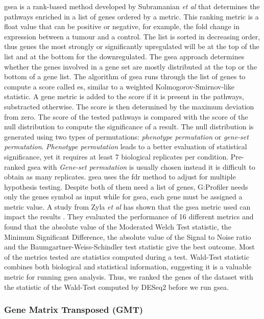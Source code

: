 \acrshort{gsea} is a rank-based method developed by Subramanian \textit{et al} \cite*{Subramanian2005} that determines the pathways enriched in a list of genes ordered by a metric.
This ranking metric is a float value that can be positive or negative, for example, the fold change in expression between a tumour and a control.
The list is sorted in decreasing order, thus genes the most strongly or significantly upregulated will be at the top of the list and at the bottom for the downregulated.
The \acrshort{gsea} approach determines whether the genes involved in a gene set are mostly distributed at the top or the bottom of a gene list.
The algorithm of \acrshort{gsea} runs through the list of genes to compute a score called  \acrfull{es}, similar to a weighted Kolmogorov-Smirnov-like statistic.
A gene metric is added to the score if it is present in the pathways, substracted otherwise.
The score is then determined by the maximum deviation from zero.
The score of the tested pathways is compared with the score of the null distribution to compute the significance of a result.
The null distribution is generated using two types of permutations: \textit{phenotype permutation} or \textit{gene-set permutation}.
\textit{Phenotype permutation} leads to a better evaluation of statistical significance, yet it requires at least 7 biological replicates per condition.
Pre-ranked \acrshort{gsea} with \textit{Gene-set permutation} is usually chosen instead it is difficult to obtain as many replicates.
\acrshort{gsea} uses the \acrshort{fdr} method to adjust for multiple hypothesis testing.
Despite both of them need a list of genes, G:Profiler needs only the genes symbol as input while for \acrshort{gsea}, each gene must be assigned a metric value.
A study from Zyla \textit{et al} has shown that the \acrshort{gsea} metric used can impact the results \cite*{Zyla2017}.
They evaluated the performance of 16 different metrics and found that the absolute value of the Moderated Welch Test statistic, the Minimum Significant Difference, the absolute value of the Signal to Noise ratio and the Baumgartner-Weiss-Schindler test statistic give the best outcome.
Most of the metrics tested are statistics computed during a test.
Wald-Test statistic combines both biological and statistical information, suggesting it is a valuable metric for running \acrshort{gsea} analysis.
Thus, we ranked the genes of the dataset with the statistic of the Wald-Test computed by DESeq2 before we run \acrshort{gsea}.

\subsubsection{Gene Matrix Transposed (GMT)}

